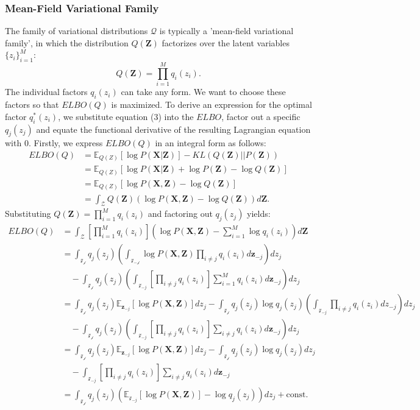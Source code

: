 \documentclass[a4paper,12pt]{article}
\numberwithin{equation}{section}
\begin{document}
\subsubsection{Mean-Field Variational Family}
The family of variational distributions $\mathcal{Q}$ is typically a 'mean-field variational family', in which the distribution $Q(\textbf{Z})$ factorizes over the latent variables $\{z_i\}^M_{i=1}$:
\begin{equation}
Q(\textbf{Z})=\prod^M_{i=1}q_i(z_i).
\end{equation}
The individual factors $q_i(z_i)$ can take any form. We want to choose these factors so that $ELBO(Q)$ is maximized. To derive an expression for the optimal factor $q_i^*(z_i)$, we substitute equation (3) into the $ELBO$, factor out a specific $q_j(z_j)$ and equate the functional derivative of the resulting Lagrangian equation with 0. Firstly, we express $ELBO(Q)$ in an integral form as follows:
\begin{align*}
ELBO(Q)&= \mathbb{E}_{Q(Z)}[\log P(\textbf{X}|\textbf{Z})]-KL(Q(\textbf{Z})||P(\textbf{Z}))\\
&= \mathbb{E}_{Q(Z)}[\log P(\textbf{X}|\textbf{Z})+\log P(\textbf{Z})-\log Q(\textbf{Z})]\\
&= \mathbb{E}_{Q(Z)}[\log P(\textbf{X}, \textbf{Z})-\log Q(\textbf{Z})]\\
&= \int_{\mathcal{Z}}Q(\textbf{Z})(\log P(\textbf{X},\textbf{Z})-\log Q(\textbf{Z}))d\textbf{Z}.
\end{align*}
Substituting $Q(\textbf{Z})=\prod^M_{i=1}q_i(z_i)$ and factoring out $q_j(z_j)$ yields:
\begin{align}
ELBO(Q)&= \int_\mathcal{Z}\left[\prod^M_{i=1}q_i(z_i)\right]\left(\log P(\textbf{X},\textbf{Z})-\sum_{i=1}^M\log q_i(z_i)\right)d\textbf{Z}\nonumber\\
&= \int_\mathcal{z_j}q_j(z_j)\left(\int_\mathcal{z_{-j}}\log P(\textbf{X},\textbf{Z})\prod_{i\neq j}q_i(z_i)d\textbf{z}_{-j} \right) dz_j\nonumber\\
&\quad -\int_{\mathcal{z_j}}q_j(z_j)\left(\int_{\mathcal{z}_{-j}}\left[\prod_{i\neq j}q_i(z_i)\right]\sum_{i=1}^M q_i(z_i)d\textbf{z}_{-j}\right)dz_j\nonumber\\
&= \int_{\mathcal{z_j}}q_j(z_j)\mathbb{E}_{\textbf{z}_{-j}}[\log P(\textbf{X},\textbf{Z})]dz_j-\int_{\mathcal{z_j}}q_j(z_j)\log q_j(z_j)\left(\int_{\mathcal{z}_{-j}}\prod_{i\neq j}q_i(z_i)dz_{-j}\right) dz_j\nonumber\\
&\quad -\int_{\mathcal{z_j}}q_j(z_j)\left(\int_{\mathcal{z}_{-j}}\left[\prod_{i\neq j}q_i(z_i)\right]\sum_{i\neq j}q_i(z_i)d{\textbf{z}_{-j}}\right)dz_j\nonumber\\
&= \int_\mathcal{z_j}q_j(z_j)\mathbb{E}_{\textbf{z}_{-j}}[\log P(\textbf{X},\textbf{Z})]dz_j-\int_\mathcal{z_j}q_j(z_j)\log q_j(z_j)dz_j\nonumber\\
&\quad -\int_{\mathcal{z}_{-j}}\left[\prod_{i\neq j}q_i(z_i)\right]\sum_{i\neq j}q_i(z_i)d{\textbf{z}_{-j}}
\\&= \int_\mathcal{z_j}q_j(z_j)\left(\mathbb{E}_{\mathcal{z}_{-j}}[\log P(\textbf{X},\textbf{Z})]-\log q_j(z_j)\right)dz_j+\text{const}.
\end{align}
\end{document}
